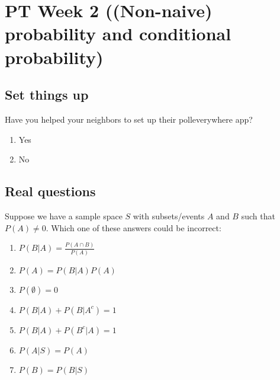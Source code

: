 \documentclass[poll_tutorial_format]{subfiles}
\begin{document}
	\maketitle
	\section{PT Week 2 ((Non-naive) probability and conditional probability)}
	
	\subsection{Set things up}
	\label{sec:set-things-up}
	
	
	
	\setcounter{theorem}{-1}

	\begin{exercise}
		Have you helped your neighbors to set up their polleverywhere app? 
		\begin{enumerate}
			\item Yes
			\item No
		\end{enumerate}
	\end{exercise}
	
	\subsection{Real questions}
	\label{sec:start-real-questions week 2}
			\begin{exercise}
		Suppose we have a sample space $S$ with subsets/events $A$ and $B$ such that $P(A)\neq 0$.
		Which one of these answers could be incorrect:%
		\begin{enumerate}
			\item $P(B|A)=\frac{P(A\cap B)}{P(A)}$
			\item $P(A)=P(B|A)P(A)$
			\item $P(\emptyset)=0$
			\item $P(B|A)+P(B|A^c)=1$
			\item $P(B|A)+P(B^c|A)=1$
			\item $P(A|S)=P(A)$
			\item $P(B)=P(B|S)$
		\end{enumerate}
	\end{exercise}

	
	
%	
%	
	
\end{document}
